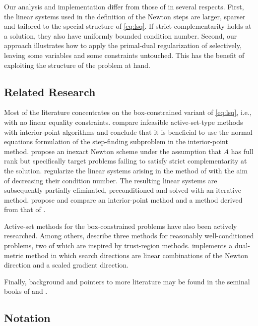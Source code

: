 \documentclass{amsart}
\begin{document}
Our analysis and implementation differ from those of
\cite{friedlander-orban-2012} in several respects. First, the
linear systems used in the definition of the Newton steps are larger, sparser
and tailored to the special structure of \eqref{eq:lsq}. If strict
complementarity holds at a solution, they also have uniformly bounded condition
number. Second, our approach illustrates how to apply the primal-dual
regularization of \cite{friedlander-orban-2012} selectively, leaving some
variables and some constraints untouched. This has the benefit of exploiting
the structure of the problem at hand.

\subsection{Related Research}

Most of the literature concentrates on the box-constrained variant of
\eqref{eq:lsq}, i.e., with no linear equality constraints.
\cite{portugal-judice-vicente-1994} compare infeasible active-set-type methods
with interior-point algorithms and conclude that it is beneficial to use the
normal equations formulation of the step-finding subproblem in the
interior-point method. \cite{bellavia-macconi-morini-2006} propose an inexact
Newton scheme under the assumption that $A$ has full rank but specifically
target problems failing to satisfy strict complementarity at the solution.
\cite{bellavia-gondzio-morini-2008} regularize the linear systems arising in
the method of \cite{bellavia-macconi-morini-2006} with the aim of decreasing
their condition number. The resulting linear systems are subsequently partially
eliminated, preconditioned and solved with an iterative method.
\cite{bellavia-gondzio-morini-2011} propose and compare an interior-point
method and a method derived from that of \cite{barzilai-borwein-1988}.

Active-set methods for the box-constrained problems have also been actively
researched. Among others, \cite{bierlaire-toint-tuyttens-1991} describe three
methods for reasonably well-conditioned problems, two of which are inspired by
trust-region methods. \cite{friedlander-2007} implements a dual-metric method
in which search directions are linear combinations of the Newton direction and
a scaled gradient direction.

Finally, background and pointers to more literature may be found in the seminal
books of \cite{lawson-hanson-1995} and \cite{bjorck-1996}.


\subsection{Notation}
\end{document}

